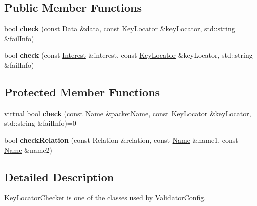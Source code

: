 \subsection*{Public Member Functions}
\begin{DoxyCompactItemize}
\item 
bool {\bfseries check} (const \hyperlink{classndn_1_1Data}{Data} \&data, const \hyperlink{classndn_1_1KeyLocator}{Key\+Locator} \&key\+Locator, std\+::string \&fail\+Info)\hypertarget{classndn_1_1security_1_1conf_1_1KeyLocatorChecker_ae3407232aa09497b01c37b5f8df355e0}{}\label{classndn_1_1security_1_1conf_1_1KeyLocatorChecker_ae3407232aa09497b01c37b5f8df355e0}

\item 
bool {\bfseries check} (const \hyperlink{classndn_1_1Interest}{Interest} \&interest, const \hyperlink{classndn_1_1KeyLocator}{Key\+Locator} \&key\+Locator, std\+::string \&fail\+Info)\hypertarget{classndn_1_1security_1_1conf_1_1KeyLocatorChecker_abbf30cf2f3b64fdf9d9388ec8dc62126}{}\label{classndn_1_1security_1_1conf_1_1KeyLocatorChecker_abbf30cf2f3b64fdf9d9388ec8dc62126}

\end{DoxyCompactItemize}
\subsection*{Protected Member Functions}
\begin{DoxyCompactItemize}
\item 
virtual bool {\bfseries check} (const \hyperlink{classndn_1_1Name}{Name} \&packet\+Name, const \hyperlink{classndn_1_1KeyLocator}{Key\+Locator} \&key\+Locator, std\+::string \&fail\+Info)=0\hypertarget{classndn_1_1security_1_1conf_1_1KeyLocatorChecker_a5125f8c02082fa6f4aadbc5d83ae5696}{}\label{classndn_1_1security_1_1conf_1_1KeyLocatorChecker_a5125f8c02082fa6f4aadbc5d83ae5696}

\item 
bool {\bfseries check\+Relation} (const Relation \&relation, const \hyperlink{classndn_1_1Name}{Name} \&name1, const \hyperlink{classndn_1_1Name}{Name} \&name2)\hypertarget{classndn_1_1security_1_1conf_1_1KeyLocatorChecker_a97fc5059773c6fc70d384f22499b61f5}{}\label{classndn_1_1security_1_1conf_1_1KeyLocatorChecker_a97fc5059773c6fc70d384f22499b61f5}

\end{DoxyCompactItemize}


\subsection{Detailed Description}
\hyperlink{classndn_1_1security_1_1conf_1_1KeyLocatorChecker}{Key\+Locator\+Checker} is one of the classes used by \hyperlink{classndn_1_1ValidatorConfig}{Validator\+Config}. 

